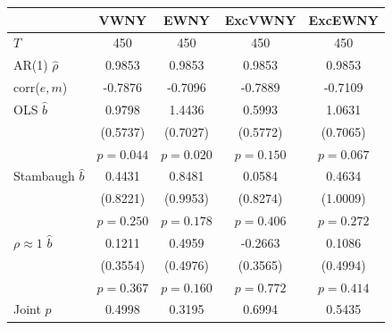 \begin{tabular}{lcccc}
\toprule
 & VWNY & EWNY & ExcVWNY & ExcEWNY \\
\midrule
$T$ & 450 & 450 & 450 & 450 \\
AR(1) $\hat\rho$ & 0.9853 & 0.9853 & 0.9853 & 0.9853 \\
corr($e,m$) & -0.7876 & -0.7096 & -0.7889 & -0.7109 \\
\midrule
OLS $\hat b$ & 0.9798 & 1.4436 & 0.5993 & 1.0631 \\
 & (0.5737) & (0.7027) & (0.5772) & (0.7065) \\
 & $p=0.044$ & $p=0.020$ & $p=0.150$ & $p=0.067$ \\
Stambaugh $\hat b$ & 0.4431 & 0.8481 & 0.0584 & 0.4634 \\
 & (0.8221) & (0.9953) & (0.8274) & (1.0009) \\
 & $p=0.250$ & $p=0.178$ & $p=0.406$ & $p=0.272$ \\
$\rho\approx1$ $\hat b$ & 0.1211 & 0.4959 & -0.2663 & 0.1086 \\
 & (0.3554) & (0.4976) & (0.3565) & (0.4994) \\
 & $p=0.367$ & $p=0.160$ & $p=0.772$ & $p=0.414$ \\
\midrule
Joint $p$ & 0.4998 & 0.3195 & 0.6994 & 0.5435 \\
\bottomrule
\end{tabular}
